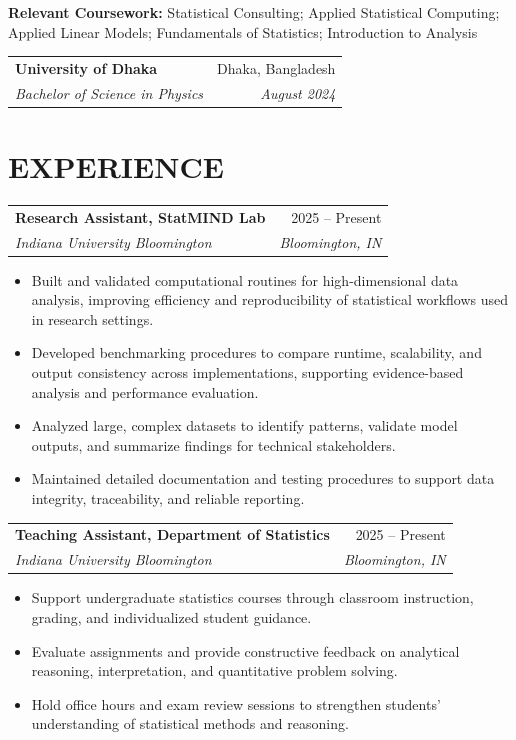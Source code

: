 \documentclass[10pt,letterpaper]{article}
\makeatletter
\newcommand{\resumeEntry}[4]{%
  \begin{tabularx}{\textwidth}{@{}Xr@{}}
    \textbf{#1} & #2 \\
    \textit{#3} & \textit{#4}
  \end{tabularx}%
}
\newenvironment{resumeItems}{%
  \begin{itemize}[
    label=\textbullet,
    leftmargin=14pt,
    labelsep=5pt,
    itemsep=0.5pt,
    topsep=1.0pt,
    parsep=0pt,
    partopsep=0pt
  ]
}{%
  \end{itemize}
}
\makeatother
\begin{document}
\vspace{0.4pt}

\textbf{Relevant Coursework:} Statistical Consulting; Applied Statistical Computing; Applied Linear Models; Fundamentals of Statistics; Introduction to Analysis

\vspace{2.2pt}

\resumeEntry
  {University of Dhaka}
  {Dhaka, Bangladesh}
  {Bachelor of Science in Physics}
  {August 2024}

\section*{EXPERIENCE}

\resumeEntry
  {Research Assistant, StatMIND Lab}
  {2025 -- Present}
  {Indiana University Bloomington}
  {Bloomington, IN}

\begin{resumeItems}
  \item Built and validated computational routines for high-dimensional data analysis, improving efficiency and reproducibility of statistical workflows used in research settings.

  \item Developed benchmarking procedures to compare runtime, scalability, and output consistency across implementations, supporting evidence-based analysis and performance evaluation.

  \item Analyzed large, complex datasets to identify patterns, validate model outputs, and summarize findings for technical stakeholders.

  \item Maintained detailed documentation and testing procedures to support data integrity, traceability, and reliable reporting.
\end{resumeItems}

\vspace{1.3pt}

\resumeEntry
  {Teaching Assistant, Department of Statistics}
  {2025 -- Present}
  {Indiana University Bloomington}
  {Bloomington, IN}

\begin{resumeItems}
  \item Support undergraduate statistics courses through classroom instruction, grading, and individualized student guidance.

  \item Evaluate assignments and provide constructive feedback on analytical reasoning, interpretation, and quantitative problem solving.

  \item Hold office hours and exam review sessions to strengthen students' understanding of statistical methods and reasoning.
\end{resumeItems}
\end{document}
